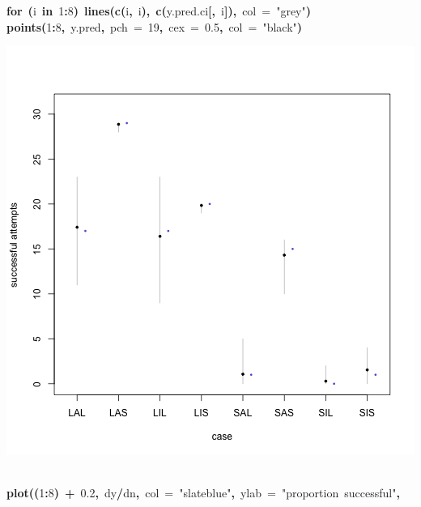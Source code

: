 \documentclass{article}
\makeatletter
\newcommand{\hlnumber}[1]{\textcolor[rgb]{0,0,0}{#1}}%
\newcommand{\hlfunctioncall}[1]{\textcolor[rgb]{.5,0,.33}{\textbf{#1}}}%
\newcommand{\hlstring}[1]{\textcolor[rgb]{.6,.6,1}{#1}}%
\newcommand{\hlkeyword}[1]{\textbf{#1}}%
\newcommand{\hlargument}[1]{\textcolor[rgb]{.69,.25,.02}{#1}}%
\newcommand{\hlsymbol}[1]{#1}%
\newcommand{\hlstd}[1]{\textcolor[rgb]{0,0,0}{#1}}%
\newenvironment{kframe}{%
 \def\FrameCommand##1{\hskip\@totalleftmargin \hskip-\fboxsep
 \colorbox{shadecolor}{##1}\hskip-\fboxsep
     \hskip-\linewidth \hskip-\@totalleftmargin \hskip\columnwidth}%
 \MakeFramed {\advance\hsize-\width
   \@totalleftmargin\z@ \linewidth\hsize
   \@setminipage}}%
 {\par\unskip\endMakeFramed}
\newenvironment{knitrout}{}{} %
\makeatother
\begin{document}
\begin{knitrout}
{\begin{kframe}
\begin{flushleft}
\hlstd{}\hlkeyword{for}{\ }\hlkeyword{(}\hlsymbol{i}{\ }\hlkeyword{in}{\ }\hlnumber{1}\hlkeyword{:}\hlnumber{8}\hlkeyword{)}{\ }\hlfunctioncall{lines}\hlkeyword{(}\hlfunctioncall{c}\hlkeyword{(}\hlsymbol{i}\hlkeyword{,}{\ }\hlsymbol{i}\hlkeyword{)}\hlkeyword{,}{\ }\hlfunctioncall{c}\hlkeyword{(}\hlsymbol{y.pred.ci}\hlkeyword{[}\hlkeyword{,}{\ }\hlsymbol{i}\hlkeyword{]}\hlkeyword{)}\hlkeyword{,}{\ }\hlargument{col}{\ }\hlargument{=}{\ }\hlstring{"grey"}\hlkeyword{)}\hspace*{\fill}\\
\hlstd{}\hlfunctioncall{points}\hlkeyword{(}\hlnumber{1}\hlkeyword{:}\hlnumber{8}\hlkeyword{,}{\ }\hlsymbol{y.pred}\hlkeyword{,}{\ }\hlargument{pch}{\ }\hlargument{=}{\ }\hlnumber{19}\hlkeyword{,}{\ }\hlargument{cex}{\ }\hlargument{=}{\ }\hlnumber{0.5}\hlkeyword{,}{\ }\hlargument{col}{\ }\hlargument{=}{\ }\hlstring{"black"}\hlkeyword{)}\mbox{}
\normalfont
\end{flushleft}
\includegraphics{better-model-fig1} \begin{flushleft}
\ttfamily\noindent
\hspace*{\fill}\\
\hlstd{}\hlfunctioncall{plot}\hlkeyword{(}\hlkeyword{(}\hlnumber{1}\hlkeyword{:}\hlnumber{8}\hlkeyword{)}{\ }\hlkeyword{+}{\ }\hlnumber{0.2}\hlkeyword{,}{\ }\hlsymbol{d}\hlkeyword{\usebox{\hlnormalsizeboxdollar}}\hlsymbol{y}\hlkeyword{/}\hlsymbol{d}\hlkeyword{\usebox{\hlnormalsizeboxdollar}}\hlsymbol{n}\hlkeyword{,}{\ }\hlargument{col}{\ }\hlargument{=}{\ }\hlstring{"slateblue"}\hlkeyword{,}{\ }\hlargument{ylab}{\ }\hlargument{=}{\ }\hlstring{"proportion{\ }successful"}\hlkeyword{,}\hspace*{\fill}\\

\end{flushleft}
\end{kframe}}
\end{knitrout}
\end{document}
